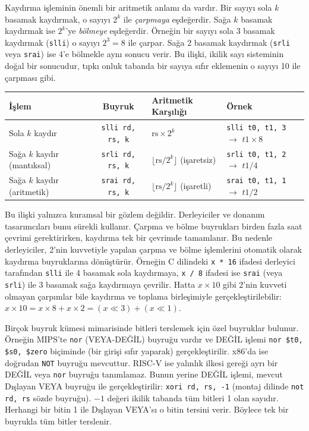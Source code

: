 Kaydırma işleminin önemli bir aritmetik anlamı da vardır. Bir sayıyı sola $k$ basamak kaydırmak, o sayıyı $2^k$ ile \emph{çarpmaya} eşdeğerdir. Sağa $k$ basamak kaydırmak ise $2^k$'ye \emph{bölmeye} eşdeğerdir. Örneğin bir sayıyı sola 3 basamak kaydırmak (\texttt{slli}) o sayıyı $2^3 = 8$ ile çarpar. Sağa 2 basamak kaydırmak (\texttt{srli} veya \texttt{srai}) ise 4'e bölmekle aynı sonucu verir. Bu ilişki, ikilik sayı sisteminin doğal bir sonucudur, tıpkı onluk tabanda bir sayıya sıfır eklemenin o sayıyı 10 ile çarpması gibi.

\begin{center}
\small
\begin{tabular}{l c l l}
\toprule
\textbf{İşlem} & \textbf{Buyruk} & \textbf{Aritmetik Karşılığı} & \textbf{Örnek} \\
\midrule
Sola $k$ kaydır & \texttt{slli rd, rs, k} & $\text{rs} \times 2^k$ & \texttt{slli t0, t1, 3} $\rightarrow$ $t1 \times 8$ \\
Sağa $k$ kaydır (mantıksal) & \texttt{srli rd, rs, k} & $\lfloor\text{rs} / 2^k\rfloor$ (işaretsiz) & \texttt{srli t0, t1, 2} $\rightarrow$ $t1 / 4$ \\
Sağa $k$ kaydır (aritmetik) & \texttt{srai rd, rs, k} & $\lfloor\text{rs} / 2^k\rfloor$ (işaretli) & \texttt{srai t0, t1, 1} $\rightarrow$ $t1 / 2$ \\
\bottomrule
\end{tabular}
\end{center}

Bu ilişki yalnızca kuramsal bir gözlem değildir. Derleyiciler ve donanım tasarımcıları bunu sürekli kullanır. Çarpma ve bölme buyrukları birden fazla saat çevrimi gerektirirken, kaydırma tek bir çevrimde tamamlanır. Bu nedenle derleyiciler, 2'nin kuvvetiyle yapılan çarpma ve bölme işlemlerini otomatik olarak kaydırma buyruklarına dönüştürür. Örneğin C dilindeki \texttt{x * 16} ifadesi derleyici tarafından \texttt{slli} ile 4 basamak sola kaydırmaya, \texttt{x / 8} ifadesi ise \texttt{srai} (veya \texttt{srli}) ile 3 basamak sağa kaydırmaya çevrilir. Hatta $x \times 10$ gibi 2'nin kuvveti olmayan çarpımlar bile kaydırma ve toplama birleşimiyle gerçekleştirilebilir: $x \times 10 = x \times 8 + x \times 2 = (x \ll 3) + (x \ll 1)$.

\begin{bilginot}
Birçok buyruk kümesi mimarisinde bitleri terslemek için özel buyruklar bulunur. Örneğin MIPS'te \texttt{nor} (VEYA-DEĞİL) buyruğu vardır ve DEĞİL işlemi \texttt{nor \$t0, \$s0, \$zero} biçiminde (bir girişi sıfır yaparak) gerçekleştirilir. x86'da ise doğrudan \texttt{NOT} buyruğu mevcuttur. RISC-V ise yalınlık ilkesi gereği ayrı bir DEĞİL veya \texttt{nor} buyruğu tanımlamaz. Bunun yerine DEĞİL işlemi, mevcut Dışlayan VEYA buyruğu ile gerçekleştirilir: \texttt{xori rd, rs, -1} (montaj dilinde \texttt{not rd, rs} sözde buyruğu). $-1$ değeri ikilik tabanda tüm bitleri 1 olan sayıdır. Herhangi bir bitin 1 ile Dışlayan VEYA'sı o bitin tersini verir. Böylece tek bir buyrukla tüm bitler terslenir.
\end{bilginot}


